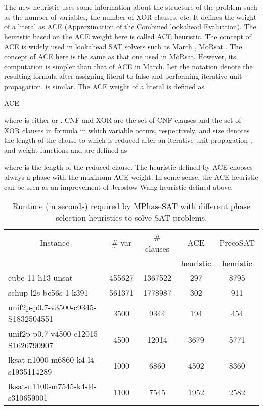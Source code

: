 \documentclass{llncs}
\begin{document}
The new heuristic uses some information about the structure of the
problem such as the number of variables, the number of XOR clauses,
etc. It defines the weight of a literal as ACE (Approximation of the
Combined lookahead Evaluation). The heuristic based on the ACE
weight here is called ACE heuristic. The concept of ACE is widely
used in lookahead SAT solvers such as March \cite {Marchhi:14},
MoRsat \cite {MoRsat:15}. The concept of ACE here is the same as
that one used in MoRsat. However, its computation is simpler than
that of ACE in March. Let the notation  denote the
resulting formula after assigning literal  to false and
performing iterative unit propagation.  is similar.
The ACE weight of a literal  is defined as
\begin{center}
 {\small
 ACE}
\end{center}
\noindent where  is either  or . CNF and XOR are the set of CNF
clauses and the set of XOR clauses in formula  in which
variable  occurs, respectively, and size denotes
the length of the clause to which  is reduced after an iterative
unit propagation , and weight functions  and
 are defined as

\hskip 10mm  

\hskip 10mm  

\noindent where  is the length of the reduced clause. The
heuristic defined by ACE chooses always a phase with the maximum ACE
weight. In some sense, the ACE heuristic can be seen as an
improvement of Jeroslow-Wang heuristic defined above.

\begin{table}
\caption{ Runtime (in seconds) required by MPhaseSAT with different
phase selection heuristics to solve SAT problems.}
\begin{center}
\renewcommand{\arraystretch}{0.95}
\setlength\tabcolsep{4pt}
\begin{tabular}{l|c|c|c|c}
\hline  \hline
\multicolumn{1}{c|}{Instance} & \# var & \# clauses & ACE &
PrecoSAT \\
 &  &  & heuristic & heuristic \\
\hline cube-11-h13-unsat  & 455627 & 1367522 & 297 & 8795 \\
schup-l2s-bc56s-1-k391 & 561371 & 1778987 & 302 & 911 \\
unif2p-p0.7-v3500-c9345-S1832504551 & 3500 & 9344 & 194 & 454 \\
unif2p-p0.7-v4500-c12015-S1626790907 & 4500 & 12014 &   3679 &    5771 \\
lksat-n1000-m6860-k4-l4-s1935114289 & 1000 & 6860 & 4502 & 8360 \\
lksat-n1100-m7545-k4-l4-s310659001 & 1100 & 7545& 1952 &   2582 \\
\hline
\end{tabular}
\end{center}
\end{table}
\end{document}
